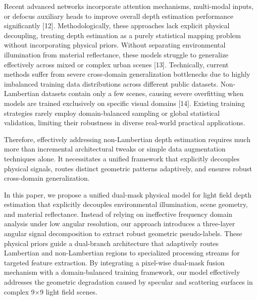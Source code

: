 Recent advanced networks incorporate attention mechanisms, multi-modal inputs, or defocus auxiliary heads to improve overall depth estimation performance significantly [12]. Methodologically, these approaches lack explicit physical decoupling, treating depth estimation as a purely statistical mapping problem without incorporating physical priors. Without separating environmental illumination from material reflectance, these models struggle to generalize effectively across mixed or complex urban scenes [13]. Technically, current methods suffer from severe cross-domain generalization bottlenecks due to highly imbalanced training data distributions across different public datasets. Non-Lambertian datasets contain only a few scenes, causing severe overfitting when models are trained exclusively on specific visual domains [14]. Existing training strategies rarely employ domain-balanced sampling or global statistical validation, limiting their robustness in diverse real-world practical applications.

Therefore, effectively addressing non-Lambertian depth estimation requires much more than incremental architectural tweaks or simple data augmentation techniques alone. It necessitates a unified framework that explicitly decouples physical signals, routes distinct geometric patterns adaptively, and ensures robust cross-domain generalization.

In this paper, we propose a unified dual-mask physical model for light field depth estimation that explicitly decouples environmental illumination, scene geometry, and material reflectance. Instead of relying on ineffective frequency domain analysis under low angular resolution, our approach introduces a three-layer angular signal decomposition to extract robust geometric pseudo-labels. These physical priors guide a dual-branch architecture that adaptively routes Lambertian and non-Lambertian regions to specialized processing streams for targeted feature extraction. By integrating a pixel-wise dual-mask fusion mechanism with a domain-balanced training framework, our model effectively addresses the geometric degradation caused by specular and scattering surfaces in complex 9×9 light field scenes.

